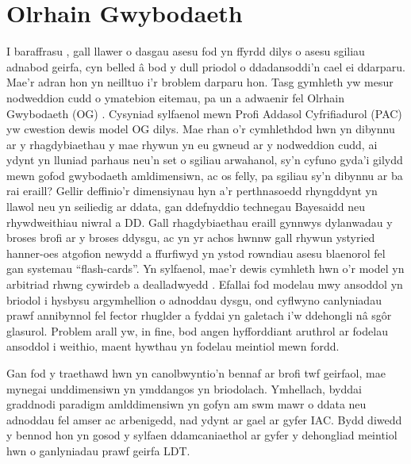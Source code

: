\section{Olrhain Gwybodaeth}
I baraffrasu \textcite{meara_complexities_1994}, gall llawer o dasgau asesu fod yn ffyrdd dilys o asesu sgiliau adnabod geirfa, cyn belled â bod y dull priodol o ddadansoddi'n cael ei ddarparu. Mae'r adran hon yn neilltuo i'r broblem darparu hon. Tasg gymhleth yw mesur nodweddion cudd o ymatebion eitemau, pa un a adwaenir fel Olrhain Gwybodaeth (OG) \parencite{shen_survey_2024}. Cysyniad sylfaenol mewn Profi Addasol Cyfrifiadurol (PAC) yw cwestion dewis model OG dilys. Mae rhan o'r cymhlethdod hwn yn dibynnu ar y rhagdybiaethau y mae rhywun yn eu gwneud ar y nodweddion cudd, ai ydynt yn lluniad parhaus neu'n set o sgiliau arwahanol, sy'n cyfuno gyda'i gilydd mewn gofod gwybodaeth amldimensiwn, ac os felly, pa sgiliau sy'n dibynnu ar ba rai eraill? Gellir deffinio'r dimensiynau hyn a'r perthnasoedd rhyngddynt yn llawol neu yn seiliedig ar ddata, gan ddefnyddio technegau Bayesaidd neu rhywdweithiau niwral a DD\@. Gall rhagdybiaethau eraill gynnwys dylanwadau y broses brofi ar y broses ddysgu, ac yn yr achos hwnnw gall rhywun ystyried hanner-oes atgofion newydd a ffurfiwyd yn ystod rowndiau asesu blaenorol fel gan systemau ``flash-cards''. Yn sylfaenol, mae'r dewis cymhleth hwn o'r model yn arbitriad rhwng cywirdeb a dealladwyedd \parencite{pelanek_adaptive_2025}. Efallai fod modelau mwy ansoddol yn briodol i hysbysu argymhellion o adnoddau dysgu, ond cyflwyno canlyniadau prawf annibynnol fel fector rhuglder a fyddai yn galetach i'w ddehongli nâ sgôr glasurol. Problem arall yw, in fine, bod angen hyfforddiant aruthrol ar fodelau ansoddol i weithio, maent hywthau yn fodelau meintiol mewn fordd.

Gan fod y traethawd hwn yn canolbwyntio'n bennaf ar brofi twf geirfaol, mae mynegai unddimensiwn yn ymddangos yn briodolach. Ymhellach, byddai graddnodi paradigm amlddimensiwn yn gofyn am swm mawr o ddata neu adnoddau fel amser ac arbenigedd, nad ydynt ar gael ar gyfer IAC\@. Bydd diwedd y bennod hon yn gosod y sylfaen ddamcaniaethol ar gyfer y dehongliad meintiol hwn o ganlyniadau prawf geirfa LDT\@.


